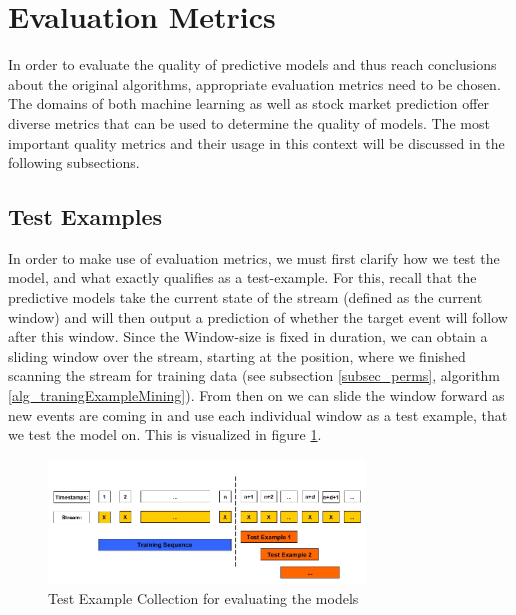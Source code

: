 \section{Evaluation Metrics}
\label{sec_evaluationMetrics}

In order to evaluate the quality of predictive models and thus reach conclusions about the original algorithms, appropriate evaluation metrics need to be chosen. The domains of both machine learning as well as stock market prediction offer diverse metrics that can be used to determine the quality of models. The most important quality metrics and their usage in this context will be discussed in the following subsections.

\subsection{Test Examples}
In order to make use of evaluation metrics, we must first clarify how we test the model, and what exactly qualifies as a test-example. For this, recall that the predictive models take the current state of the stream (defined as the current window) and will then output a prediction of whether the target event will follow after this window. Since the Window-size is fixed in duration, we can obtain a sliding window over the stream, starting at the position, where we finished scanning the stream for training data (see subsection \ref{subsec_perms}, algorithm \ref{alg_traningExampleMining}). From then on we can slide the window forward as new events are coming in and use each individual window as a test example, that we test the model on. This is visualized in figure \ref{fig_testData}.

\begin{figure}[h]
	\centering
  	\includegraphics[width=0.75\textwidth]{testData}
	\caption{Test Example Collection for evaluating the models}
	\label{fig_testData}
\end{figure}

